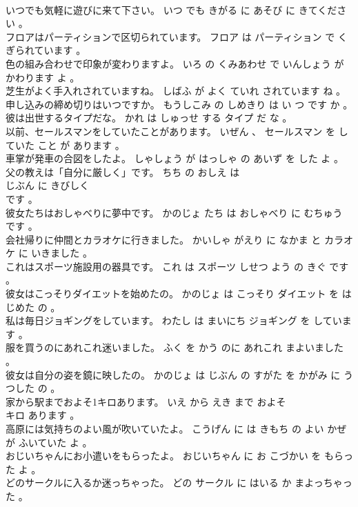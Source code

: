 \documentclass[8pt]{extreport}
\begin{document}
\begin{CJK}{UTF8}{min}
\\	いつでも気軽に遊びに来て下さい。	いつ でも きがる に あそび に きてください 。 
\\	フロアはパーティションで区切られています。	フロア は パーティション で くぎられています 。 
\\	色の組み合わせで印象が変わりますよ。	いろ の くみあわせ で いんしょう が かわります よ 。 
\\	芝生がよく手入れされていますね。	しばふ が よく ていれ されています ね 。 
\\	申し込みの締め切りはいつですか。	もうしこみ の しめきり は い つ です か 。 
\\	彼は出世するタイプだな。	かれ は しゅっせ する タイプ だ な 。 
\\	以前、セールスマンをしていたことがあります。	いぜん 、 セールスマン を していた こと が あります 。 
\\	車掌が発車の合図をしたよ。	しゃしょう が はっしゃ の あいず を した よ 。 
\\	父の教えは「自分に厳しく」です。	ちち の おしえ は 
\\	じぶん に きびしく 
\\	です 。 
\\	彼女たちはおしゃべりに夢中です。	かのじょ たち は おしゃべり に むちゅう です 。 
\\	会社帰りに仲間とカラオケに行きました。	かいしゃ がえり に なかま と カラオケ に いきました 。 
\\	これはスポーツ施設用の器具です。	これ は スポーツ しせつ よう の きぐ です 。 
\\	彼女はこっそりダイエットを始めたの。	かのじょ は こっそり ダイエット を はじめた の 。 
\\	私は毎日ジョギングをしています。	わたし は まいにち ジョギング を しています 。 
\\	服を買うのにあれこれ迷いました。	ふく を かう のに あれこれ まよいました 。 
\\	彼女は自分の姿を鏡に映したの。	かのじょ は じぶん の すがた を かがみ に うつした の 。 
\\	家から駅までおよそ1キロあります。	いえ から えき まで およそ 
\\	キロ あります 。 
\\	高原には気持ちのよい風が吹いていたよ。	こうげん に は きもち の よい かぜ が ふいていた よ 。 
\\	おじいちゃんにお小遣いをもらったよ。	おじいちゃん に お こづかい を もらった よ 。 
\\	どのサークルに入るか迷っちゃった。	どの サークル に はいる か まよっちゃった 。 

\end{CJK}
\end{document}
